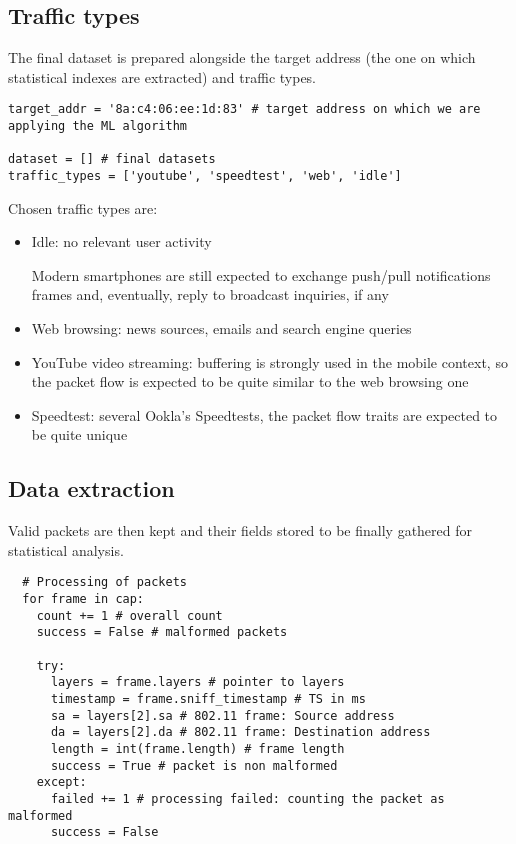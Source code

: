 \documentclass[a4paper,11pt]{article} %
\begin{document}
    \subsection{Traffic types}\label{subsec:traffic-types}

    The final dataset is prepared alongside the target address (the one on which statistical indexes are extracted) and traffic types.

    \begin{verbatim}
target_addr = '8a:c4:06:ee:1d:83' # target address on which we are applying the ML algorithm

dataset = [] # final datasets
traffic_types = ['youtube', 'speedtest', 'web', 'idle']
    \end{verbatim}

    Chosen traffic types are:

    \begin{itemize}
        \item Idle: no relevant user activity

        Modern smartphones are still expected to exchange push/pull notifications frames and, eventually, reply to broadcast inquiries, if any
        \item Web browsing: news sources, emails and search engine queries
        \item YouTube video streaming: buffering is strongly used in the mobile context, so the packet flow is expected to be quite similar to the web browsing one
        \item Speedtest: several Ookla's Speedtests, the packet flow traits are expected to be quite unique
    \end{itemize}

    \subsection{Data extraction}\label{subsec:data-extraction}

    Valid packets are then kept and their fields stored to be finally gathered for statistical analysis.

    \begin{verbatim}
  # Processing of packets
  for frame in cap:
    count += 1 # overall count
    success = False # malformed packets

    try:
      layers = frame.layers # pointer to layers
      timestamp = frame.sniff_timestamp # TS in ms
      sa = layers[2].sa # 802.11 frame: Source address
      da = layers[2].da # 802.11 frame: Destination address
      length = int(frame.length) # frame length
      success = True # packet is non malformed
    except:
      failed += 1 # processing failed: counting the packet as malformed
      success = False
    \end{verbatim}
\end{document}
